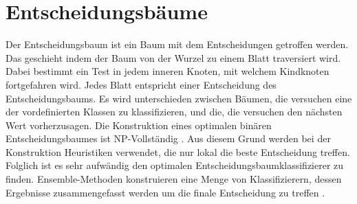 \chapter{Entscheidungsbäume}
Der Entscheidungsbaum ist ein Baum mit dem Entscheidungen getroffen werden. Das geschieht indem der Baum von der Wurzel zu einem Blatt traversiert wird. Dabei bestimmt ein Test in jedem inneren Knoten,
mit welchem Kindknoten fortgefahren wird. Jedes Blatt entspricht einer Entscheidung des Entscheidungsbaums. Es wird unterschieden zwischen Bäumen, die versuchen eine der vordefinierten Klassen zu klassifizieren,
und die, die versuchen den nächsten Wert vorherzusagen.
\newline
\newline
Die Konstruktion eines optimalen binären Entscheidungsbaumes ist NP-Vollständig \cite{laurent1976constructing}. Aus diesem Grund werden bei der Konstruktion
Heuristiken verwendet, die nur lokal die beste Entscheidung treffen. Folglich ist es sehr aufwändig den optimalen Entscheidungsbaumklassifizierer zu finden. Ensemble-Methoden konstruieren eine Menge von
Klassifizierern, dessen Ergebnisse zusammengefasst werden um die finale Entscheidung zu treffen \cite{dietterich2002ensemble}.

